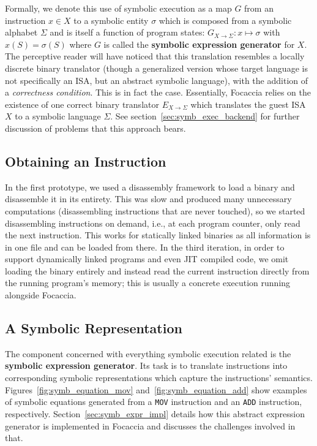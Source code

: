 Formally, we denote this use of symbolic execution as a map $G$ from an instruction $x \in X$ to a symbolic entity
$\sigma$ which is composed from a symbolic alphabet $\Sigma$ and is itself a function of program states: $G_{X
\rightarrow \Sigma}: x \mapsto \sigma$ with $x(S) = \sigma(S)$ where $G$ is called the \textbf{symbolic expression
generator} for $X$. The perceptive reader will have noticed that this translation resembles a locally discrete binary
translator (though a generalized version whose target language is not specifically an \ac{ISA}, but an abstract symbolic
language), with the addition of a \textit{correctness condition}. This is in fact the case. Essentially, Focaccia relies
on the existence of one correct binary translator $E_{X \rightarrow \Sigma}$ which translates the guest \ac{ISA} $X$ to
a symbolic language $\Sigma$. See section~\ref{sec:symb_exec_backend} for further discussion of problems that this
approach bears.

\subsection{Obtaining an Instruction}

In the first prototype, we used a disassembly framework to load a binary and disassemble it in its entirety. This was
slow and produced many unnecessary computations (disassembling instructions that are never touched), so we started
disassembling instructions on demand, i.e., at each program counter, only read the next instruction. This works for
statically linked binaries as all information is in one file and can be loaded from there. In the third iteration, in
order to support dynamically linked programs and even \ac{JIT} compiled code, we omit loading the binary entirely and
instead read the current instruction directly from the running program's memory; this is usually a concrete execution
running alongside Focaccia.

\subsection{A Symbolic Representation}

The component concerned with everything symbolic execution related is the \textbf{symbolic expression generator}. Its
task is to translate instructions into corresponding symbolic representations which capture the instructions' semantics.
Figures~\ref{fig:symb_equation_mov} and~\ref{fig:symb_equation_add} show examples of symbolic equations generated from a
\texttt{MOV} instruction and an \texttt{ADD} instruction, respectively. Section~\ref{sec:symb_expr_impl} details how
this abstract expression generator is implemented in Focaccia and discusses the challenges involved in that.

